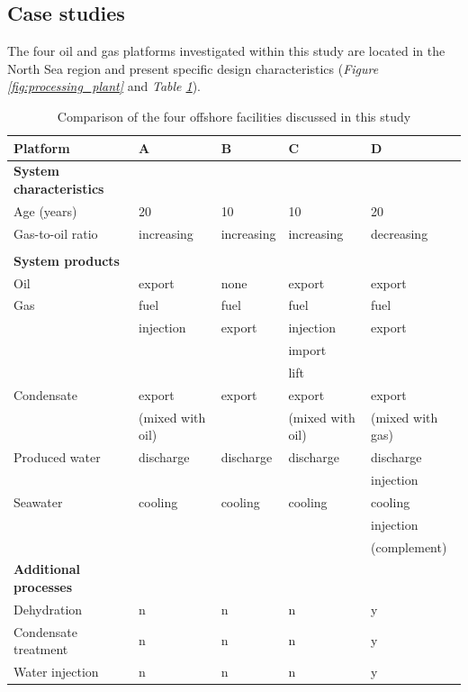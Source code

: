 \documentclass[times,3p]{elsarticle}
\begin{document}
\subsection{Case studies}
\label{subsec:specific}

The four oil and gas platforms investigated within this study are located in the North Sea region and present specific design characteristics (\emph{Figure \ref{fig:processing_plant}} and \emph{Table \ref{tab:platform_characteristics}}). 

\begin{table}[htbp]
\scriptsize
  \centering
  \caption{Comparison of the four offshore facilities discussed in this study}
    \begin{tabular}{lllll}
    \toprule
    \textbf{Platform} & A     & B     & C     & D \\
    \midrule
    \textbf{System characteristics} &       &       &       &  \\
    Age (years) & 20    & 10    & 10    & 20 \\
    Gas-to-oil ratio & increasing & increasing & increasing & decreasing \\
    \textbf{} &       &       &       &  \\
    \textbf{System products} &       &       &       &  \\
    Oil   & export & none  & export & export \\
    Gas   & fuel  & fuel  & fuel  & fuel \\
          & injection & export & injection & export \\
          &       &       & import &  \\
          &       &       & lift  &  \\
    Condensate & export & export & export & export \\
          & (mixed with oil) &       & (mixed with oil) & (mixed with gas) \\
    Produced water & discharge & discharge & discharge & discharge \\
          &       &       &       & injection \\
    Seawater & cooling & cooling & cooling & cooling \\
          &       &       &       & injection \\
          &       &       &       & (complement) \\
    \textbf{Additional processes} &       &       &       &  \\
    Dehydration & n     & n     & n     & y \\
    Condensate treatment & n     & n     & n     & y \\
    Water injection  & n     & n     & n     & y \\
    \bottomrule
    \end{tabular}%
  \label{tab:platform_characteristics}%
\end{table}%
\end{document}
